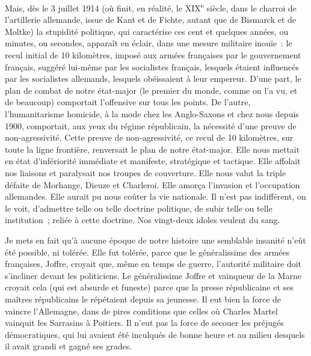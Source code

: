 \documentclass[french,twoside]{book} %
\begin{document}
Mais, dès le 3 juillet 1914 (où finit, en réalité, le XIX\textsuperscript{e} siècle, dans le charroi de l’artillerie allemande, issue de Kant et de Fichte, autant que de Bismarck et de Moltke) la stupidité politique, qui caractérise ces cent et quelques années, ou minutes, ou secondes, apparaît en éclair, dans une mesure militaire inouïe : le recul initial de 10 kilomètres, imposé aux armées françaises par le gouvernement français, suggéré lui-même par les socialistes français, lesquels étaient influencés par les socialistes allemands, lesquels obéissaient à leur empereur. D’une part, le plan de combat de notre état-major (le premier du monde, comme on l’a vu, et de beaucoup) comportait l’offensive sur tous les points. De l’autre, l’humanitarisme homicide, à la mode chez les Anglo-Saxons et chez nous depuis 1900, comportait, aux yeux du régime républicain, la nécessité d’une preuve de non-agressivité. Cette preuve de non-agressivité, ce recul de 10 kilomètres, sur toute la ligne frontière, renversait le plan de notre état-major. Elle nous mettait en état d’infériorité immédiate et manifeste, stratégique et tactique. Elle affolait nos liaisons et paralysait nos troupes de couverture. Elle nous valut la triple défaite de Morhange, Dieuze et Charleroi. Elle amorça l’invasion et l’occupation allemandes. Elle aurait pu nous coûter la vie nationale. Il n’est pas indifférent, on le voit, d’admettre telle ou telle doctrine politique, de subir telle ou telle institution ; reliée à cette doctrine. Nos vingt-deux idoles veulent du sang.\par
Je mets en fait qu’à aucune époque de notre histoire une semblable insanité n’eût été possible, ni tolérée. Elle fut tolérée, parce que le généralissime des armées françaises, Joffre, croyait que, même en temps de guerre, l’autorité militaire doit s’incliner devant les politiciens. Le généralissime Joffre et vainqueur de la Marne croyait cela (qui est absurde et funeste) parce que la presse républicaine et ses maîtres républicains le répétaient depuis sa jeunesse. Il eut bien la force de vaincre l’Allemagne, dans de pires conditions que celles où Charles Martel vainquit les Sarrasins à Poitiers. Il n’eut pas la force de secouer les préjugés démocratiques, qui lui avaient été inculqués de bonne heure et au milieu desquels il avait grandi et gagné ses grades.\par
\end{document}
